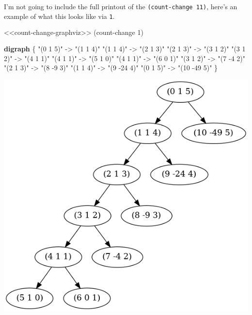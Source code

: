 \documentclass[
]{article}
\newenvironment{Shaded}{}{}
\newcommand{\CommentTok}[1]{\textcolor[rgb]{0.38,0.63,0.69}{\textit{#1}}}
\newcommand{\DecValTok}[1]{\textcolor[rgb]{0.25,0.63,0.44}{#1}}
\newcommand{\KeywordTok}[1]{\textcolor[rgb]{0.00,0.44,0.13}{\textbf{#1}}}
\newcommand{\NormalTok}[1]{#1}
\newcommand{\OtherTok}[1]{\textcolor[rgb]{0.00,0.44,0.13}{#1}}
\newcommand{\StringTok}[1]{\textcolor[rgb]{0.25,0.44,0.63}{#1}}
\begin{document}
I'm not going to include the full printout of the
\texttt{(count-change\ 11)}, here's an example of what this looks like
via \texttt{1}.

\hypertarget{count-change-test}{%
\label{count-change-test}}%
\begin{Shaded}
\begin{Highlighting}[numbers=left,,]
\NormalTok{\textless{}\textless{}count{-}change{-}graphviz\textgreater{}\textgreater{}}
\NormalTok{(count{-}change }\DecValTok{1}\NormalTok{)}
\end{Highlighting}
\end{Shaded}

\begin{Shaded}
\begin{Highlighting}[]
\KeywordTok{digraph} \OtherTok{\{}
\StringTok{"(0 1 5)"}\CommentTok{ }\OtherTok{{-}\textgreater{}}\CommentTok{ }\StringTok{"(1 1 4)"}
\StringTok{"(1 1 4)"}\CommentTok{ }\OtherTok{{-}\textgreater{}}\CommentTok{ }\StringTok{"(2 1 3)"}
\StringTok{"(2 1 3)"}\CommentTok{ }\OtherTok{{-}\textgreater{}}\CommentTok{ }\StringTok{"(3 1 2)"}
\StringTok{"(3 1 2)"}\CommentTok{ }\OtherTok{{-}\textgreater{}}\CommentTok{ }\StringTok{"(4 1 1)"}
\StringTok{"(4 1 1)"}\CommentTok{ }\OtherTok{{-}\textgreater{}}\CommentTok{ }\StringTok{"(5 1 0)"}
\StringTok{"(4 1 1)"}\CommentTok{ }\OtherTok{{-}\textgreater{}}\CommentTok{ }\StringTok{"(6 0 1)"}
\StringTok{"(3 1 2)"}\CommentTok{ }\OtherTok{{-}\textgreater{}}\CommentTok{ }\StringTok{"(7 {-}4 2)"}
\StringTok{"(2 1 3)"}\CommentTok{ }\OtherTok{{-}\textgreater{}}\CommentTok{ }\StringTok{"(8 {-}9 3)"}
\StringTok{"(1 1 4)"}\CommentTok{ }\OtherTok{{-}\textgreater{}}\CommentTok{ }\StringTok{"(9 {-}24 4)"}
\StringTok{"(0 1 5)"}\CommentTok{ }\OtherTok{{-}\textgreater{}}\CommentTok{ }\StringTok{"(10 {-}49 5)"}
\OtherTok{\}}
\end{Highlighting}
\end{Shaded}

\includegraphics{fig/cc-test.png}
\end{document}
